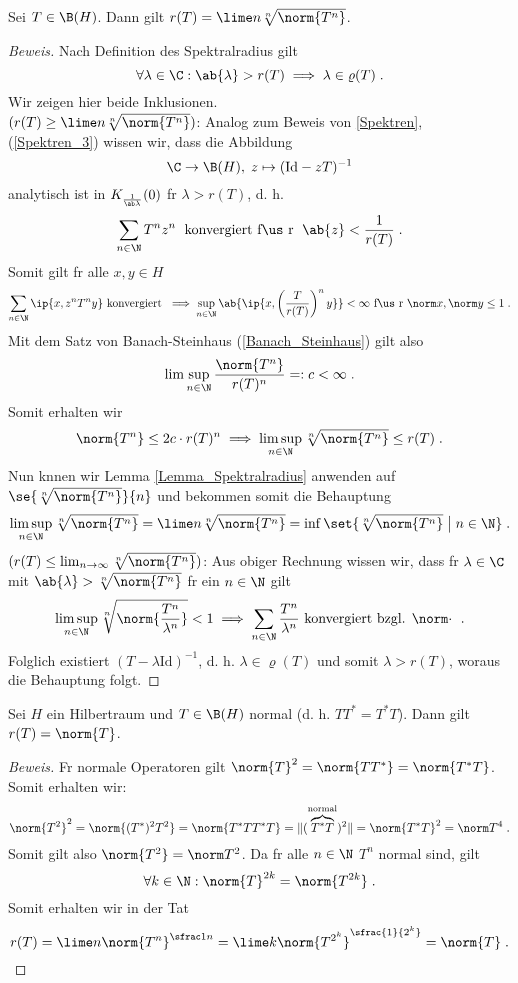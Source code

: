 	\begin{theorem}
		Sei \(T\in\B(H)\). Dann gilt \(r(T) = \lime n \sqrt[n]{\norm{T^n}}\).
	\end{theorem}
	\begin{proof}[Beweis]
		\happybegin
		Nach Definition des Spektralradius gilt 
		\[\forall \lambda \in \C: \ab{\lambda} > r(T) \implies \lambda \in \varrho(T)\;.\]
		Wir zeigen hier beide Inklusionen.\\
		\((r(T) \geq \lime n \sqrt[n]{\norm{T^n}})\): Analog zum Beweis von \ref{Spektren}, (\ref{Spektren_3}) wissen wir, dass die Abbildung 
		\[\C \to \B(H),\; z \mapsto (\text{Id} - z T)^{-1}\]
		analytisch ist in \(K_{\frac{1}{\ab\lambda}}(0)\) f\us r \(\lambda > r(T)\), d. h. 
		\[\sum_{n\in\N} T^n z^n \;\text{ konvergiert f\us r }\; \ab{z} < \frac{1}{r(T)}\;.\]
		Somit gilt f\us r alle \(x,y \in H\) 
		\[\sum_{n\in\N} \ip{x, z^n T^ny} \text{ konvergiert }\implies  \sup_{n\in\N}\ab{\ip{x, \left(\frac{T}{r(T)}\right)^n y}} < \infty \text{ f\us r } \norm x, \norm y \leq 1\;.\]
		Mit dem Satz von Banach-Steinhaus (\ref{Banach_Steinhaus}) gilt also \[\lim\sup_{n\in\N}\frac{\norm{T^n}}{r(T)^n} =: c < \infty\;.\]
		Somit erhalten wir
		\[\norm{T^n} \leq 2c \cdot r(T)^n \implies \limsup_{n\in\N}\sqrt[n]{\norm{T^n}} \leq r(T)\;.\]
			Nun k\os nnen wir Lemma \ref{Lemma_Spektralradius} anwenden auf \(\se{ \sqrt[n]{\norm{T^n}}}{n}\) und bekommen somit die Behauptung
		\[\limsup_{n\in\N}\sqrt[n]{\norm{T^n}} = \lime n \sqrt[n]{\norm{T^n}} = \inf\set{\sqrt[n]{\norm{T^n}}\;\big\vert\; n\in \N}\;.\]
		\((r(T) \leq \lim_{n\to\infty} \sqrt[n]{\norm{T^n}})\): Aus obiger Rechnung wissen wir, dass f\us r \(\lambda \in \C\) mit \(\ab{\lambda} > \sqrt[n]{\norm{T^n}}\) f\us r ein \(n\in\N\) gilt
		\[\limsup_{n\in\N} \sqrt[n]{\norm{\frac{T^n}{\lambda^n}}} < 1\implies \sum_{n\in\N} \frac{T^n}{\lambda^n}\text{ konvergiert bzgl. $\norm\cdot$ }\;.\]
		Folglich existiert \((T-\lambda\text{Id})^{-1}\), d. h. \(\lambda \in \varrho(T)\) und somit \(\lambda > r(T)\), woraus die Behauptung folgt.\happyend
	\end{proof}
	
	
	\begin{theorem}
		Sei $H$ ein Hilbertraum und \(T \in \B(H)\) normal (d. h. \(TT^* = T^*T\)). Dann gilt \(r(T) = \norm{T}\).
	\end{theorem}
	\begin{proof}[Beweis]
		F\us r normale Operatoren gilt \(\norm{T}^2 = \norm{TT^*} = \norm{T^*T}\). Somit erhalten wir:
		\[\norm{T^2}^2 = \norm{(T^*)^2 T^2} = \norm{T^*TT^*T} = \lVert(\overbrace{T^*T}^{\text{normal}})^2\rVert = \norm{T^*T}^2 = \norm T^4\;.\]
		Somit gilt also \(\norm{T^2} = \norm T^2\). Da f\us r alle \(n\in\N\) $T^n$ normal sind, gilt  
		\[\forall k\in\N: \norm{T}^{2k} = \norm{T^{2k}}\;.\]
		Somit erhalten wir in der Tat 
		\[r(T) = \lime n \norm{T^n}^{\sfrac 1n} = \lime k \norm{T^{2^k}}^{\sfrac{1}{2^k}} = \norm{T}\;. \]
		
	\end{proof}